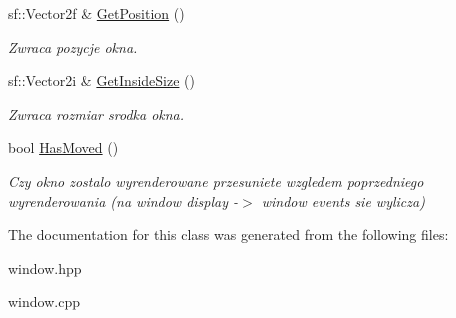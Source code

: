 \begin{DoxyCompactItemize}
sf\+::\+Vector2f \& \mbox{\hyperlink{classtfp_1_1_window_a4504bd36c4813013e6b6a3fa3905f057}{Get\+Position}} ()
\begin{DoxyCompactList}\small\item\em Zwraca pozycje okna. \end{DoxyCompactList}\item 
\mbox{\label{classtfp_1_1_window_acc5251f2a2d0b282ca85d4910222ca12}} 
sf\+::\+Vector2i \& \mbox{\hyperlink{classtfp_1_1_window_acc5251f2a2d0b282ca85d4910222ca12}{Get\+Inside\+Size}} ()
\begin{DoxyCompactList}\small\item\em Zwraca rozmiar srodka okna. \end{DoxyCompactList}\item 
\mbox{\label{classtfp_1_1_window_ae859692c6e2d03dfce986dd352fc6625}} 
bool \mbox{\hyperlink{classtfp_1_1_window_ae859692c6e2d03dfce986dd352fc6625}{Has\+Moved}} ()
\begin{DoxyCompactList}\small\item\em Czy okno zostalo wyrenderowane przesuniete wzgledem poprzedniego wyrenderowania (na window display -\/$>$ window events sie wylicza) \end{DoxyCompactList}\end{DoxyCompactItemize}


The documentation for this class was generated from the following files\+:\begin{DoxyCompactItemize}
\item 
window.\+hpp\item 
window.\+cpp\end{DoxyCompactItemize}
